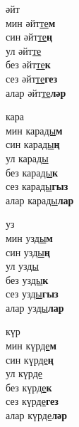 \begin{multicols}{4}
\begin{enumerate}
\begin{minipage}{\linewidth}
    \item
    әйт\\
    мин әйт\underline{те}\textbf{м}\\
    син әйт\underline{те}\textbf{ң}\\
    ул әйт\underline{те}\\
    без әйт\underline{те}\textbf{к}\\
    сез әйт\underline{те}\textbf{гез}\\
    алар әйт\underline{те}\textbf{ләр}\\
\end{minipage}

\begin{minipage}{\linewidth}
    \item
    кара\\
    мин кара\underline{ды}\textbf{м}\\
    син кара\underline{ды}\textbf{ң}\\
    ул кара\underline{ды}\\
    без кара\underline{ды}\textbf{к}\\
    сез кара\underline{ды}\textbf{гыз}\\
    алар кара\underline{ды}\textbf{лар}\\
\end{minipage}

\begin{minipage}{\linewidth}
    \item
    уз\\
    мин уз\underline{ды}\textbf{м}\\
    син уз\underline{ды}\textbf{ң}\\
    ул уз\underline{ды}\\
    без уз\underline{ды}\textbf{к}\\
    сез уз\underline{ды}\textbf{гыз}\\
    алар уз\underline{ды}\textbf{лар}\\
\end{minipage}

\begin{minipage}{\linewidth}
    \item
    күр\\
    мин күр\underline{де}\textbf{м}\\
    син күр\underline{де}\textbf{ң}\\
    ул күр\underline{де}\\
    без күр\underline{де}\textbf{к}\\
    сез күр\underline{де}\textbf{гез}\\
    алар күр\underline{де}\textbf{ләр}\\
\end{minipage}


\end{enumerate}
\end{multicols}
